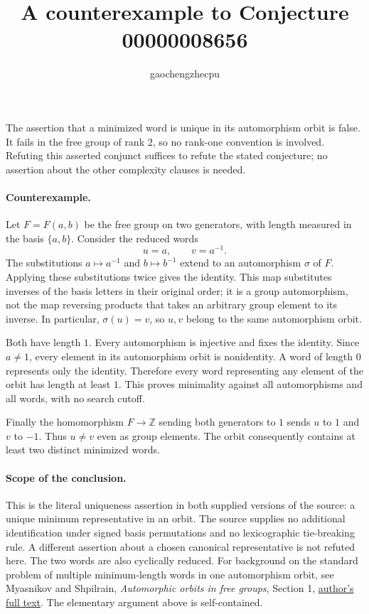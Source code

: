 \documentclass[11pt]{article}
\title{A counterexample to Conjecture 00000008656}
\author{gaochengzhecpu}
\date{}
\begin{document}
\maketitle

The assertion that a minimized word is unique in its automorphism orbit is
false.  It fails in the free group of rank $2$, so no rank-one convention is
involved.  Refuting this asserted conjunct suffices to refute the stated
conjecture; no assertion about the other complexity clauses is needed.

\paragraph{Counterexample.}
Let $F=F(a,b)$ be the free group on two generators, with length measured in
the basis $\{a,b\}$.  Consider the reduced words
\[
 u=a,\qquad v=a^{-1}.
\]
The substitutions $a\mapsto a^{-1}$ and $b\mapsto b^{-1}$ extend to an
automorphism $\sigma$ of $F$.  Applying these substitutions twice gives the
identity.  This map substitutes inverses of the basis letters in their
original order; it is a group automorphism, not the map reversing products
that takes an arbitrary group element to its inverse.
In particular, $\sigma(u)=v$, so $u,v$ belong to the same automorphism orbit.

Both have length $1$.  Every automorphism is injective and fixes the identity.
Since $a\ne1$, every element in its automorphism orbit is nonidentity.  A word
of length $0$ represents only the identity.  Therefore every word representing
any element of the orbit has length at least $1$.  This proves minimality
against all automorphisms and all words, with no search cutoff.

Finally the homomorphism $F\to\mathbb Z$ sending both generators to $1$
sends $u$ to $1$ and $v$ to $-1$.  Thus $u\ne v$ even as group elements.
The orbit consequently contains at least two distinct minimized words.

\paragraph{Scope of the conclusion.}
This is the literal uniqueness assertion in both supplied versions of the
source: a unique minimum representative in an orbit.  The source supplies
no additional identification under signed basis permutations and no
lexicographic tie-breaking rule.  A different assertion about a chosen
canonical representative is not refuted here.  The two words are also
cyclically reduced.  For background on the standard problem of multiple
minimum-length words in one automorphism orbit, see Myasnikov and Shpilrain,
\emph{Automorphic orbits in free groups}, Section 1,
\href{https://shpilrain.ccny.cuny.edu/orbit.pdf}{author's full text}.
The elementary argument above is self-contained.
\end{document}
